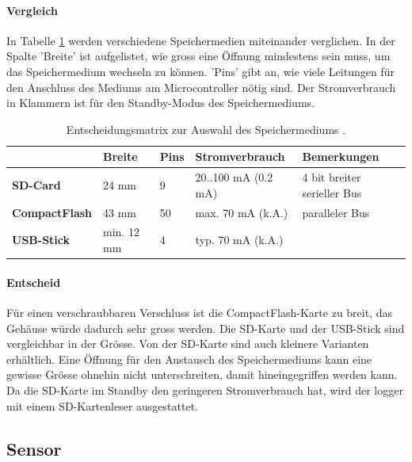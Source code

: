 \paragraph{Vergleich} In Tabelle \ref{table.speichermedium} werden verschiedene Speichermedien miteinander verglichen. In der Spalte 'Breite' ist aufgelistet, wie gross eine Öffnung mindestens sein muss, um das Speichermedium wechseln zu können. 'Pins' gibt an, wie viele Leitungen für den Anschluss des Mediums am Microcontroller nötig sind. Der Stromverbrauch in Klammern ist für den Standby-Modus des Speichermediums.

\begin{table}
\begin{tabular}{|l|l|l|l|l|}
	\hline
	                      & \textbf{Breite} & \textbf{Pins} & \textbf{Stromverbrauch} & \textbf{Bemerkungen}        \\ \hline
	\textbf{SD-Card}      & 24 mm           & 9             & 20..100 mA (0.2 mA)     & 4 bit breiter serieller Bus \\ \hline
	\textbf{CompactFlash} & 43 mm           & 50            & max. 70 mA (k.A.)       & paralleler Bus              \\ \hline
	\textbf{USB-Stick}    & min. 12 mm      & 4             & typ. 70 mA (k.A.) &  \\ \hline
\end{tabular} 
\caption{Entscheidungsmatrix zur Auswahl des Speichermediums \cite{sdstd,cfstd,usbwiki}.}
\label{table.speichermedium}
\end{table} 

\paragraph{Entscheid} Für einen verschraubbaren Verschluss ist die CompactFlash-Karte zu breit, das Gehäuse würde dadurch sehr gross werden. Die SD-Karte und der USB-Stick sind vergleichbar in der Grösse. Von der SD-Karte sind auch kleinere Varianten erhältlich. Eine Öffnung für den Austausch des Speichermediums kann eine gewisse Grösse ohnehin nicht unterschreiten, damit hineingegriffen werden kann. Da die SD-Karte im Standby den geringeren Stromverbrauch hat, wird der \gls{logger} mit einem SD-Kartenleser ausgestattet.

\subsection{Sensor}

